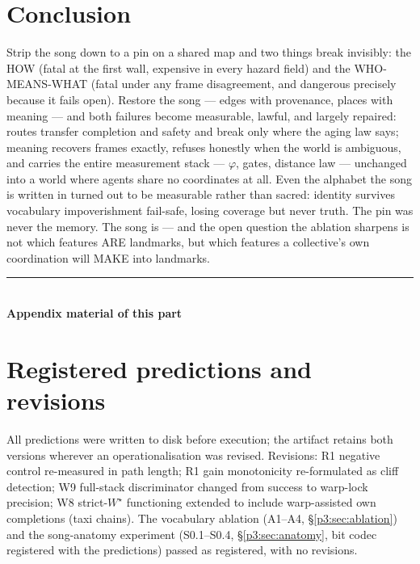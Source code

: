 \documentclass{article}
\newcommand{\wstar}{W^{\star}}
\begin{document}
\section{Conclusion}

Strip the song down to a pin on a shared map and two things break
invisibly: the HOW (fatal at the first wall, expensive in every
hazard field) and the WHO-MEANS-WHAT (fatal under any frame
disagreement, and dangerous precisely because it fails open). Restore
the song --- edges with provenance, places with meaning --- and both
failures become measurable, lawful, and largely repaired: routes
transfer completion and safety and break only where the aging law
says; meaning recovers frames exactly, refuses honestly when the
world is ambiguous, and carries the entire measurement stack ---
$\varphi$, gates, distance law --- unchanged into a world where
agents share no coordinates at all. Even the alphabet the song is
written in turned out to be measurable rather than sacred: identity
survives vocabulary impoverishment fail-safe, losing coverage but
never truth. The pin was never the memory. The song is --- and the
open question the ablation sharpens is not which features ARE
landmarks, but which features a collective's own coordination will
MAKE into landmarks.

\FloatBarrier
\begin{center}\rule{0.55\linewidth}{0.4pt}\\[2pt]\textbf{Appendix material of this part}\end{center}


\section{Registered predictions and revisions}
\label{p3:app:registered}
All predictions were written to disk before execution; the artifact
retains both versions wherever an operationalisation was revised.
Revisions: R1 negative control re-measured in path length; R1 gain
monotonicity re-formulated as cliff detection; W9 full-stack
discriminator changed from success to warp-lock precision; W8
strict-$\wstar$ functioning extended to include warp-assisted own
completions (taxi chains). The vocabulary ablation (A1--A4,
\S\ref{p3:sec:ablation}) and the song-anatomy experiment (S0.1--S0.4,
\S\ref{p3:sec:anatomy}, bit codec registered with the predictions)
passed as registered, with no revisions.
\end{document}
